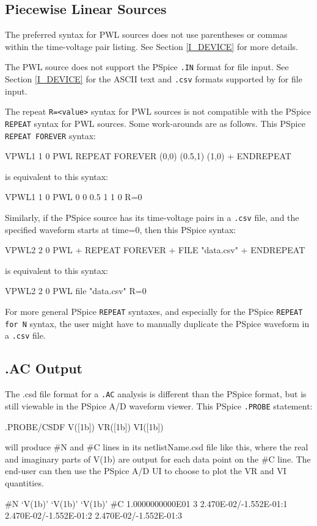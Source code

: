 \subsection{Piecewise Linear Sources}
\label{PWL_SOURCE_SYNTAX_DIFF}
The preferred \Xyce{} syntax for PWL sources does not use parentheses or commas within
the time-voltage pair listing.  See Section \ref{I_DEVICE} for more details.

The \Xyce{} PWL source does not support the PSpice \texttt{.IN} format for file input.  
See Section \ref{I_DEVICE} for the ASCII text and \texttt{.csv} formats supported 
by \Xyce{} for file input.

The \Xyce{} repeat \texttt{R=<value>} syntax for PWL sources is not compatible with 
the PSpice \texttt{REPEAT} syntax for PWL sources.  Some work-arounds are as follows.
This PSpice \texttt{REPEAT FOREVER} syntax:
\begin{vquote}
VPWL1 1 0 PWL REPEAT FOREVER (0,0) (0.5,1) (1,0)
+ ENDREPEAT
\end{vquote}
is equivalent to this \Xyce{} syntax:
\begin{vquote}
VPWL1 1 0 PWL 0 0 0.5 1 1 0 R=0
\end{vquote}
Similarly, if the PSpice source has its time-voltage pairs in a \texttt{.csv}
file, and the specified waveform starts at time=0, then this PSpice syntax:
\begin{vquote}
VPWL2 2 0 PWL 
+ REPEAT FOREVER
+ FILE "data.csv"
+ ENDREPEAT
\end{vquote}
is equivalent to this \Xyce{} syntax:
\begin{vquote}
VPWL2 2 0 PWL file "data.csv" R=0
\end{vquote}
For more general PSpice \texttt{REPEAT} syntaxes, and especially for the PSpice
\texttt{REPEAT for N} syntax, the user might have to manually duplicate the 
PSpice waveform in a \texttt{.csv} file.

\subsection{.AC Output}
The \Xyce{} .csd file format for a \texttt{.AC} analysis is different than the
PSpice format, but is still viewable in the PSpice A/D waveform viewer.  This
PSpice \texttt{.PROBE} statement:
\begin{vquote}
.PROBE/CSDF V([1b]) VR([1b]) VI([1b])
\end{vquote}
will produce \#N and \#C lines in its netlistName.csd file like this, where the
real and imaginary parts of V(1b) are output for each data point on the \#C line.
The end-user can then use the PSpice A/D UI to choose to plot the VR and VI
quantities.
\begin{vquote}
#N
`V(1b)' `V(1b)' `V(1b)'
#C 1.0000000000E01 3
2.470E-02/-1.552E-01:1 2.470E-02/-1.552E-01:2 2.470E-02/-1.552E-01:3
\end{vquote}

